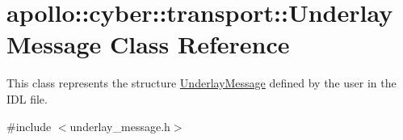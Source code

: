 \hypertarget{classapollo_1_1cyber_1_1transport_1_1UnderlayMessage}{\section{apollo\-:\-:cyber\-:\-:transport\-:\-:Underlay\-Message Class Reference}
\label{classapollo_1_1cyber_1_1transport_1_1UnderlayMessage}
}


This class represents the structure \hyperlink{classapollo_1_1cyber_1_1transport_1_1UnderlayMessage}{Underlay\-Message} defined by the user in the I\-D\-L file.  




{\ttfamily \#include $<$underlay\-\_\-message.\-h$>$}

